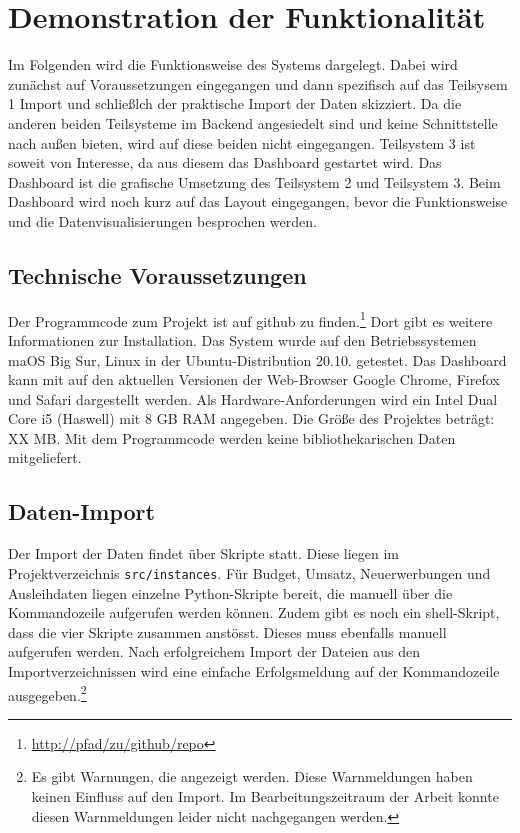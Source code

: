 
\section{Demonstration der Funktionalität}

    Im Folgenden wird die Funktionsweise des Systems dargelegt. Dabei wird zunächst auf Voraussetzungen eingegangen und dann
    spezifisch auf das Teilsysem 1 Import und schließlch der
    praktische Import der Daten skizziert. Da die anderen beiden Teilsysteme im Backend angesiedelt sind und keine Schnittstelle
    nach außen bieten, wird auf diese beiden nicht eingegangen. Teilsystem 3 ist soweit von Interesse, da aus diesem das Dashboard
    gestartet wird. Das Dashboard ist die grafische Umsetzung des Teilsystem 2 und Teilsystem 3. Beim Dashboard wird noch kurz auf das Layout
    eingegangen, bevor die Funktionsweise und die Datenvisualisierungen besprochen werden.


    \subsection{Technische Voraussetzungen}
    Der Programmcode zum Projekt ist auf github zu finden.\footnote{\url{http://pfad/zu/github/repo}} Dort gibt es weitere Informationen zur Installation.
    Das System wurde auf den Betriebssystemen maOS Big Sur, Linux in der Ubuntu-Distribution 20.10. getestet.
    Das Dashboard kann mit auf den aktuellen Versionen der Web-Browser Google Chrome, Firefox und Safari dargestellt werden. 
    Als Hardware-Anforderungen wird ein Intel Dual Core i5 (Haswell) mit 8 GB RAM angegeben. Die Größe des Projektes beträgt: XX MB. 
    Mit dem Programmcode werden keine bibliothekarischen Daten mitgeliefert.
    
    \subsection{Daten-Import}
    Der Import der Daten findet über Skripte statt. Diese liegen im Projektverzeichnis \texttt{src/instances}.
    Für Budget, Umsatz, Neuerwerbungen und Ausleihdaten liegen einzelne Python-Skripte bereit, die manuell über die Kommandozeile
    aufgerufen werden können. Zudem gibt es noch ein shell-Skript, dass die vier Skripte zusammen anstösst. Dieses
    muss ebenfalls manuell aufgerufen werden.
    Nach erfolgreichem Import der Dateien aus den Importverzeichnissen wird eine einfache Erfolgsmeldung auf der Kommandozeile ausgegeben.\footnote{Es gibt Warnungen,
    die angezeigt werden. Diese Warnmeldungen haben keinen Einfluss auf den Import. Im Bearbeitungszeitraum der Arbeit konnte diesen Warnmeldungen leider nicht nachgegangen werden.}

